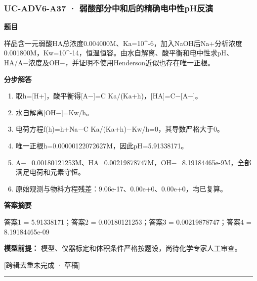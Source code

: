 \documentclass[UTF8,11pt,a4paper]{ctexart}
\begin{document}
\subsubsection*{UC-ADV6-A37 · 弱酸部分中和后的精确电中性pH反演}
\noindent\textbf{题目}\par
样品含一元弱酸HA总浓度0.004000M、Ka=10\textasciicircum{}-6，加入NaOH后Na+分析浓度0.001800M，Kw=10\textasciicircum{}-14，恒温恒容。由水自解离、酸平衡和电中性求pH、HA/A−浓度及OH−，并证明不使用Henderson近似也存在唯一正根。\par
\medskip\noindent\textbf{分步解答}
\begin{enumerate}
\item 取h=[H+]，酸平衡得[A−]=C Ka/(Ka+h)，[HA]=C−[A−]。
\item 水自解离[OH−]=Kw/h。
\item 电荷方程f(h)=h+Na−C Ka/(Ka+h)−Kw/h=0，其导数严格大于0。
\item 唯一正根h=0.00000122072627M，因此pH=5.91338171。
\item A−=0.00180121253M、HA=0.00219878747M，OH−=8.19184465e-9M，全部满足电荷和元素守恒。
\item 原始观测与物料方程残差：9.06e-17、0.00e+0、0.00e+0，均已复算。
\end{enumerate}
\noindent\textbf{答案摘要}\par
答案1 = 5.91338171；答案2 = 0.00180121253；答案3 = 0.00219878747；答案4 = 8.19184465e-09\par
\noindent\textbf{模型前提：}
模型、仪器标定和体积条件严格按题设，尚待化学专家人工审查。\par
\noindent\textcolor{red!65!black}{[跨辑去重未完成 · 草稿]} \par
\medskip\hrule\medskip
{}
\end{document}
